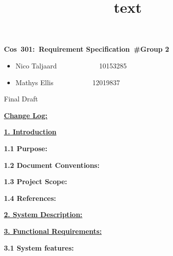 \documentclass[12pt]{article}
\newcommand{\Title}{Requirement Specification\ \#Group 2} %
\newcommand{\Class}{Cos\ 301} %
\begin{document}
\title{text}
	\vspace{2in}
	\hspace{1.2in}
	\textmd{\textbf{\Class:\ \Title}}\\
	\vspace{2in}


\begin{itemize} %
	\item Nico Taljaard \ ~~~~~~~~~ \ 10153285
	\item Mathys Ellis \ ~~~~~~~~ \ 12019837
\end{itemize}

\vspace{2in}
\hspace{2.5in} 
	Final Draft

\newpage
	\textbf{\underline{Change Log:}}
	
	
	
\newpage
	\textbf{\underline{1. Introduction}}
	
	\vspace{0.2in}

		\textbf{1.1 Purpose:} %
		\vspace{0.1in}
		
	
	\vspace{0.2in}
	
		\textbf{1.2 Document Conventions:} %
		\vspace{0.1in}
		
	
	\vspace{0.2in}
	
		\textbf{1.3 Project Scope:}
		\vspace{0.1in}
		
		
	
	\vspace{0.2in}
	
		\textbf{1.4 References:}
		\vspace{0.1in}
			
	
	\vspace{0.5in}
	
	\textbf{\underline{2. System Description:}}
	\vspace{0.2in}
	
	
	
	\vspace{0.5in}
	
	\newpage
	\textbf{\underline{3. Functional Requirements:}}
	\vspace{0.2in}
		
		\textbf{3.1 System features:} %
		\vspace{0.1in}
		
\end{document}
